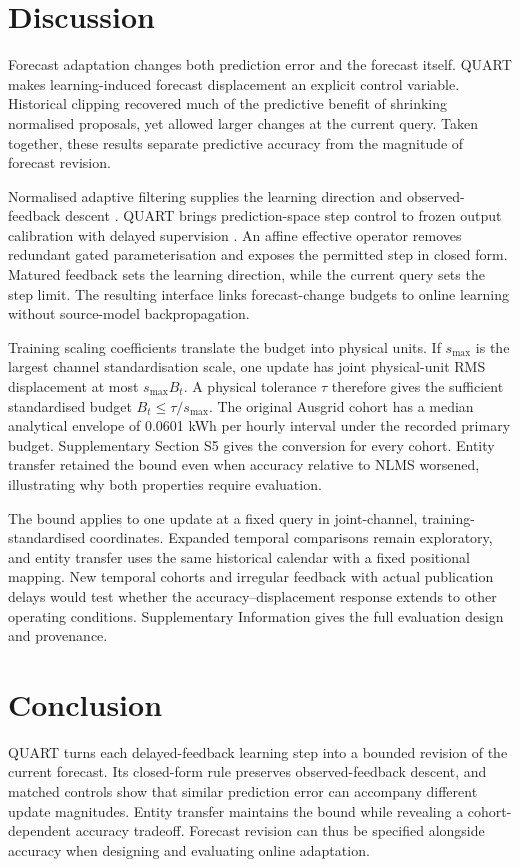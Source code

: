 \documentclass[preprint,12pt,times,nonatbib]{elsarticle}
\begin{document}
\FloatBarrier
\section{Discussion}
Forecast adaptation changes both prediction error and the forecast itself. QUART makes learning-induced forecast displacement an explicit control variable. Historical clipping recovered much of the predictive benefit of shrinking normalised proposals, yet allowed larger changes at the current query. Taken together, these results separate predictive accuracy from the magnitude of forecast revision.

Normalised adaptive filtering supplies the learning direction and observed-feedback descent \parencite{nagumo1967}. QUART brings prediction-space step control \parencite{schulman2015trpo} to frozen output calibration with delayed supervision \parencite{kim2025tta,im2026cosa,wang2026fac}. An affine effective operator removes redundant gated parameterisation and exposes the permitted step in closed form. Matured feedback sets the learning direction, while the current query sets the step limit. The resulting interface links forecast-change budgets to online learning without source-model backpropagation.

Training scaling coefficients translate the budget into physical units. If $s_{\max}$ is the largest channel standardisation scale, one update has joint physical-unit RMS displacement at most $s_{\max}B_t$. A physical tolerance $\tau$ therefore gives the sufficient standardised budget $B_t\leq\tau/s_{\max}$. The original Ausgrid cohort has a median analytical envelope of 0.0601 kWh per hourly interval under the recorded primary budget. Supplementary Section S5 gives the conversion for every cohort. Entity transfer retained the bound even when accuracy relative to NLMS worsened, illustrating why both properties require evaluation.

The bound applies to one update at a fixed query in joint-channel, training-standardised coordinates. Expanded temporal comparisons remain exploratory, and entity transfer uses the same historical calendar with a fixed positional mapping. New temporal cohorts and irregular feedback with actual publication delays would test whether the accuracy--displacement response extends to other operating conditions. Supplementary Information gives the full evaluation design and provenance.

\section{Conclusion}
QUART turns each delayed-feedback learning step into a bounded revision of the current forecast. Its closed-form rule preserves observed-feedback descent, and matched controls show that similar prediction error can accompany different update magnitudes. Entity transfer maintains the bound while revealing a cohort-dependent accuracy tradeoff. Forecast revision can thus be specified alongside accuracy when designing and evaluating online adaptation.
\end{document}
